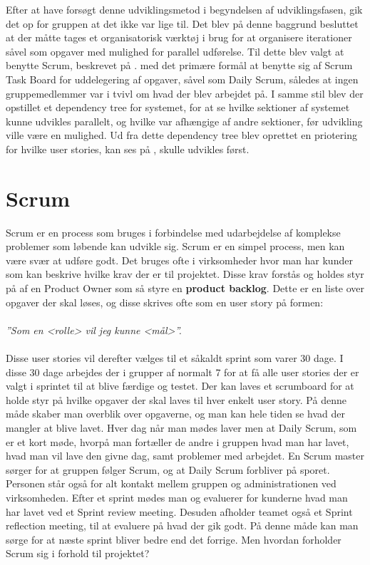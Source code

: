 Efter at have forsøgt denne udviklingsmetod i begyndelsen af udviklingsfasen, gik det op for gruppen at det ikke var lige til.
Det blev på denne baggrund besluttet at der måtte tages et organisatorisk værktøj i brug for at organisere iterationer såvel som opgaver med mulighed for parallel udførelse.
Til dette blev valgt at benytte Scrum, beskrevet på . med det primære formål at benytte sig af Scrum Task Board for uddelegering af opgaver, såvel som Daily Scrum, således at ingen gruppemedlemmer var i tvivl om hvad der blev arbejdet på.
I samme stil blev der opstillet et dependency tree for systemet, for at se hvilke sektioner af systemet kunne udvikles parallelt, og hvilke var afhængige af andre sektioner, før udvikling ville være en mulighed.
Ud fra dette dependency tree blev oprettet en priotering for hvilke user stories, kan ses på , skulle udvikles først.

\section{Scrum}\label{scrum}

Scrum er en process som bruges i forbindelse med udarbejdelse af komplekse problemer som løbende kan udvikle sig. 
Scrum er en simpel process, men kan være svær at udføre godt.
Det bruges ofte i virksomheder hvor man har kunder som kan beskrive hvilke krav der er til projektet.
Disse krav forstås og holdes styr på af en Product Owner som så styre en \textbf{product backlog}.
Dette er en liste over opgaver der skal løses, og disse skrives ofte som en user story på formen:\\ \\ \textit{''Som en <rolle> vil jeg kunne <mål>''. }\\ \\
Disse user stories vil derefter vælges til et såkaldt sprint som varer 30 dage. 
I disse 30 dage arbejdes der i grupper af normalt 7 for at få alle user stories der er valgt i sprintet til at blive færdige og testet.
Der kan laves et scrumboard for at holde styr på hvilke opgaver der skal laves til hver enkelt user story. 
På denne måde skaber man overblik over opgaverne, og man kan hele tiden se hvad der mangler at blive lavet.
Hver dag når man mødes laver men at Daily Scrum, som er et kort møde, hvorpå man fortæller de andre i gruppen hvad man har lavet, hvad man vil lave den givne dag, samt problemer med arbejdet.
En Scrum master sørger for at gruppen følger Scrum, og at Daily Scrum forbliver på sporet. 
Personen står også for alt kontakt mellem gruppen og administrationen ved virksomheden.
Efter et sprint mødes man og evaluerer for kunderne hvad man har lavet ved et Sprint review meeting.
Desuden afholder teamet også et Sprint reflection meeting, til at evaluere på hvad der gik godt.
På denne måde kan man sørge for at næste sprint bliver bedre end det forrige. 
Men hvordan forholder Scrum sig i forhold til projektet?

